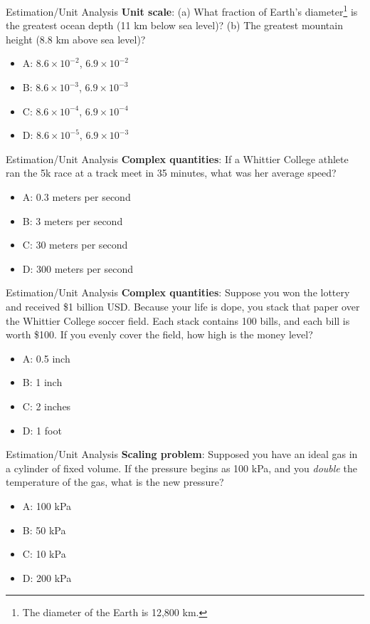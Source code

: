 \documentclass{beamer}
\begin{document}
\begin{frame}{Estimation/Unit Analysis}
\textbf{Unit scale}: (a) What fraction of Earth’s diameter\footnote{The diameter of the Earth is 12,800 km.} is the greatest ocean depth (11 km below sea level)? (b) The greatest mountain height (8.8 km above sea level)?
\begin{itemize}
\item A: $8.6 \times 10^{-2}$, $6.9 \times 10^{-2}$
\item B: $8.6 \times 10^{-3}$, $6.9 \times 10^{-3}$
\item C: $8.6 \times 10^{-4}$, $6.9 \times 10^{-4}$
\item D: $8.6 \times 10^{-5}$, $6.9 \times 10^{-3}$
\end{itemize}
\end{frame}

\begin{frame}{Estimation/Unit Analysis}
\textbf{Complex quantities}: If a Whittier College athlete ran the 5k race at a track meet in 35 minutes, what was her average speed?
\begin{itemize}
\item A: 0.3 meters per second
\item B: 3 meters per second
\item C: 30 meters per second
\item D: 300 meters per second
\end{itemize}
\end{frame}

\begin{frame}{Estimation/Unit Analysis}
\textbf{Complex quantities}: Suppose you won the lottery and received \$1 billion USD.  Because your life is dope, you stack that paper over the Whittier College soccer field.  Each stack contains 100 bills, and each bill is worth \$100.  If you evenly cover the field, how high is the money level?
\begin{itemize}
\item A: 0.5 inch
\item B: 1 inch
\item C: 2 inches
\item D: 1 foot
\end{itemize}
\end{frame}

\begin{frame}{Estimation/Unit Analysis}
\textbf{Scaling problem}: Supposed you have an ideal gas in a cylinder of fixed volume.  If the pressure begins as 100 kPa, and you \textit{double} the temperature of the gas, what is the new pressure?
\begin{itemize}
\item A: 100 kPa
\item B: 50 kPa
\item C: 10 kPa
\item D: 200 kPa
\end{itemize}
\end{frame}
\end{document}

